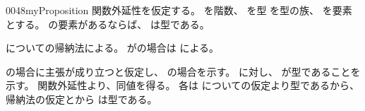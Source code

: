 \documentclass[index]{subfiles}
\begin{document}
\begin{myBlock}{0048}{myProposition}
  関数外延性を仮定する。
  を階数、
  を型
  を型の族、
  を要素とする。
  の要素があるならば、
  は型である。
\end{myBlock}
\begin{myProof}
  についての帰納法による。
  が\myInlineMath{\myTLMinusTwo}の場合は
  による。

  の場合に主張が成り立つと仮定し、
  の場合を示す。
  に対し、
  が型であることを示す。
  関数外延性より、同値を得る。
  各は
  についての仮定より型であるから、
  帰納法の仮定とから
  は型である。
\end{myProof}
\end{document}
